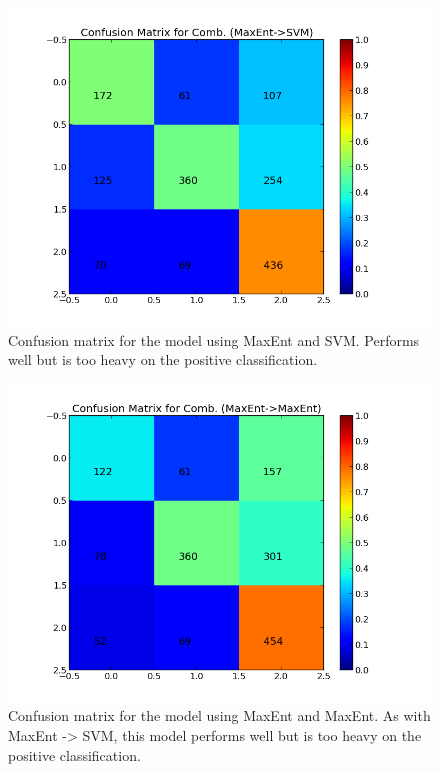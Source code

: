 \begin{minipage}[t!]{\linewidth}
     \centering
     \begin{minipage}{0.45\linewidth}
          \begin{figure}[H]
               \includegraphics[width=\linewidth]{../img/plots/grid/confusion_matrix_Comb-MaxEnt-SVM.png}
           \caption[The confusion matrix for two-step MaxEnt -> SVM]{Confusion matrix for the model using MaxEnt and SVM. Performs well but is too heavy on the positive classification.}
           \label{fig:confmat_maxent_svm}
          \end{figure}
     \end{minipage}
     \hspace{0.05\linewidth}
     \begin{minipage}{0.45\linewidth}
          \begin{figure}[H]
               \includegraphics[width=\linewidth]{../img/plots/grid/confusion_matrix_Comb-MaxEnt-MaxEnt.png}
           \caption[The confusion matrix for two-step MaxEnt -> MaxEnt]{Confusion matrix for the model using MaxEnt and MaxEnt. As with MaxEnt -> SVM, this model performs well but is too heavy on the positive classification.}
           \label{fig:confmat_maxent_maxent}
          \end{figure}
     \end{minipage}
\end{minipage}

